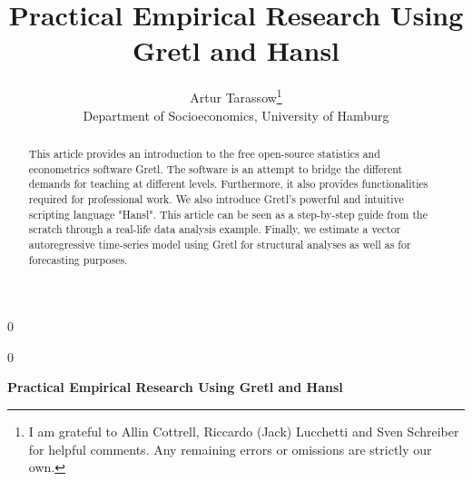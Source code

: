 \documentclass[11pt]{article}
\newcommand{\blind}{0}
\begin{document}
%

\def\spacingset#1{\renewcommand{\baselinestretch}%
	{#1}\small\normalsize} \spacingset{1}



\blind
{
	\title{\bf Practical Empirical Research Using Gretl and Hansl}
	\author{Artur Tarassow\thanks{
			I am grateful to Allin Cottrell, Riccardo (Jack) Lucchetti and Sven Schreiber for helpful comments. Any remaining errors or omissions are strictly our own.}\hspace{.2cm}\\
		Department of Socioeconomics, University of Hamburg}
	\maketitle
} \fi

\blind
{
	\bigskip
	\bigskip
	\bigskip
	\begin{center}
		{\LARGE\bf Practical Empirical Research Using Gretl and Hansl}
	\end{center}
	\medskip
} \fi

\bigskip
\begin{abstract}
	\noindent This article provides an introduction to the free open-source statistics and econometrics software Gretl. The software is an attempt to bridge the different demands for teaching at different levels. Furthermore, it also provides functionalities required for professional work. We also introduce Gretl's powerful and intuitive scripting language "Hansl". This article can be seen as a step-by-step guide from the scratch through a real-life data analysis example. Finally, we estimate a vector autoregressive time-series model using Gretl for structural analyses as well as for forecasting purposes.
\end{abstract}


\vfill

\newpage
\doublespacing

\newpage
\end{document}
